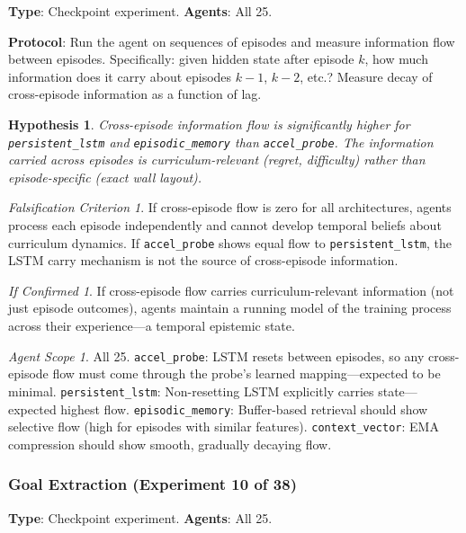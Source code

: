 \documentclass[11pt,a4paper]{article}
\newtheorem{hypothesis}{Hypothesis}[subsection]
\theoremstyle{remark}
\newtheorem*{falsification}{Falsification Criterion}
\newtheorem*{implication}{If Confirmed}
\newtheorem*{agentscope}{Agent Scope}
\begin{document}
\textbf{Type}: Checkpoint experiment. \textbf{Agents}: All 25.

\textbf{Protocol}: Run the agent on sequences of episodes and measure information flow between episodes. Specifically: given hidden state after episode $k$, how much information does it carry about episodes $k-1$, $k-2$, etc.? Measure decay of cross-episode information as a function of lag.

\begin{hypothesis}
Cross-episode information flow is significantly higher for \texttt{persistent\_lstm} and \texttt{episodic\_memory} than \texttt{accel\_probe}. The information carried across episodes is curriculum-relevant (regret, difficulty) rather than episode-specific (exact wall layout).
\end{hypothesis}

\begin{falsification}
If cross-episode flow is zero for all architectures, agents process each episode independently and cannot develop temporal beliefs about curriculum dynamics. If \texttt{accel\_probe} shows equal flow to \texttt{persistent\_lstm}, the LSTM carry mechanism is not the source of cross-episode information.
\end{falsification}

\begin{implication}
If cross-episode flow carries curriculum-relevant information (not just episode outcomes), agents maintain a running model of the training process across their experience---a temporal epistemic state.
\end{implication}

\begin{agentscope}
All 25. \texttt{accel\_probe}: LSTM resets between episodes, so any cross-episode flow must come through the probe's learned mapping---expected to be minimal. \texttt{persistent\_lstm}: Non-resetting LSTM explicitly carries state---expected highest flow. \texttt{episodic\_memory}: Buffer-based retrieval should show selective flow (high for episodes with similar features). \texttt{context\_vector}: EMA compression should show smooth, gradually decaying flow.
\end{agentscope}

\subsubsection{Goal Extraction (Experiment 10 of 38)}
\label{exp:goal_extraction}

\textbf{Type}: Checkpoint experiment. \textbf{Agents}: All 25.
\end{document}
